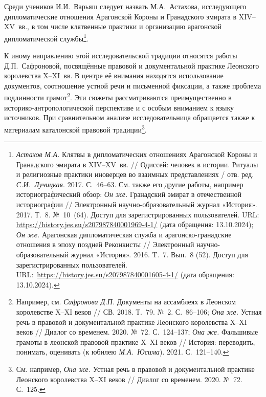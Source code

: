 Среди учеников И.И.~Варьяш следует назвать М.А.~Астахова, исследующего дипломатические отношения Арагонской Короны и Гранадского эмирата в XIV--XV~вв., в том числе клятвенные практики и организацию арагонской дипломатической службы\footnote{\emph{Астахов М.А.} Клятвы в дипломатических отношениях Арагонской Короны и Гранадского эмирата в XIV--XV~вв. // Одиссей: человек в истории. Ритуалы и религиозные практики иноверцев во взаимных представлениях / отв. ред. \emph{С.И.~Лучицкая}. 2017. С.~46--63. См. также его другие работы, например историографический обзор: \emph{Он же. }Гранадский эмират в отечественной историографии // Электронный научно-образовательный журнал «История». 2017. Т.~8. №~10~(64). Доступ для зарегистрированных пользователей. URL: \url{https://history.jes.su/s207987840001969-4-1/} (дата обращения: 13.10.2024); \emph{Он же.} Арагонская дипломатическая служба и арагонско-гранадские отношения в эпоху поздней Реконкисты // Электронный научно-образовательный журнал «История». 2016. T.~7. Вып.~8 (52). Доступ для зарегистрированных пользователей. URL:~\url{https://history.jes.su/s207987840001605-4-1/} (дата обращения: 13.10.2024).}.

К иному направлению этой исследовательской традиции относятся работы Д.П.~Сафроновой, посвящённые правовой и документальной практике Леонского королевства X--XI~вв. В центре её внимания находятся использование документов, соотношение устной речи и письменной фиксации, а также проблема подлинности грамот\footnote{Например, см. \emph{Сафронова Д.П.} Документы на ассамблеях в Леонском королевстве X--XI веков // СВ. 2018. Т.~79. №~2. С.~86--106; \emph{Она же.} Устная речь в правовой и документальной практике Леонского королевства X--XI веков // Диалог со временем. 2020. №~72. С.~124--137; \emph{Она же.} Фальшивые грамоты в леонской правовой практике X--XI веков // История: переводить, понимать, оценивать (к юбилею \emph{М.А.~Юсима}). 2021. С.~121--140.}. Эти сюжеты рассматриваются преимущественно в историко-антропологической перспективе и с особым вниманием к языку источников. При сравнительном анализе исследовательница обращается также к материалам каталонской правовой традиции\footnote{См. например, \emph{Она же.} Устная речь в правовой и документальной практике Леонского королевства X--XI веков // Диалог со временем. 2020. №~72. С.~125.}.

